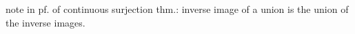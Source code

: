 

note in pf. of continuous surjection thm.: inverse image of a union is the union of the inverse images.
